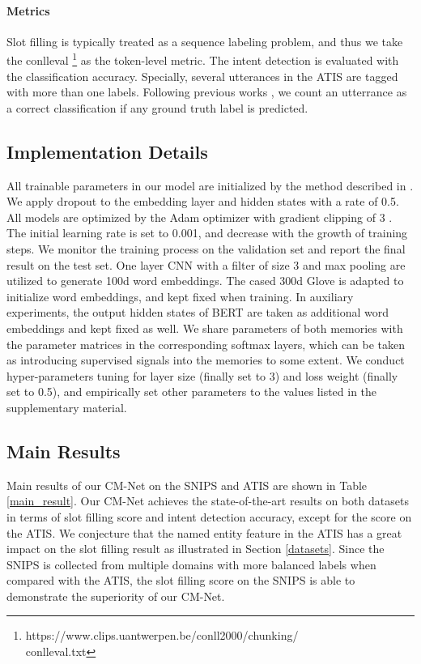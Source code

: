 \documentclass[11pt,a4paper]{article}
\begin{document}
\paragraph{Metrics} 
Slot filling is typically treated as a sequence labeling problem, and thus we take the conlleval \footnote{https://www.clips.uantwerpen.be/conll2000/chunking/\\conlleval.txt} as the token-level   metric. The intent detection is evaluated with the classification accuracy. Specially, several utterances in the ATIS are tagged with more than one labels. Following previous works \cite{atis_2010,a_joint_2016}, we count an utterrance as a correct classification if any ground truth label is predicted.

\subsection{Implementation Details}

All trainable parameters in our model are initialized by the method described in \citeauthor{Xavier} . We apply dropout \cite{dropout} to the embedding layer and hidden states with a rate of 0.5. All models are optimized by the Adam optimizer \cite{Adam} with gradient clipping of 3 \cite{gradient_clip}. 
The initial learning rate  is set to 0.001, and decrease with the growth of training steps. We monitor the training process on the validation set and report the final result on the test set. 
One layer CNN with a filter of size 3 and max pooling are utilized to generate 100d word embeddings. The cased 300d Glove is adapted to initialize word embeddings, and kept fixed when training. In auxiliary experiments, the output hidden states of BERT are taken as additional word embeddings and kept fixed as well. We share parameters of both memories with the parameter matrices in the corresponding softmax layers, which can be taken as introducing supervised signals into the memories to some extent. We conduct hyper-parameters tuning for layer size (finally set to 3) and loss weight  (finally set to 0.5), and empirically set other parameters to the values listed in the supplementary material.

\subsection{Main Results}
Main results of our CM-Net on the SNIPS and ATIS are shown in Table \ref{main_result}. Our CM-Net achieves the state-of-the-art results on both datasets in terms of slot filling  score and intent detection accuracy, except for the  score on the ATIS. We conjecture that the named entity feature in the ATIS has a great impact on the slot filling result as illustrated in Section \ref{datasets}. Since the SNIPS is collected from multiple domains with more balanced labels when compared with the ATIS, the slot filling  score on the SNIPS is able to demonstrate the superiority of our CM-Net.
\end{document}
